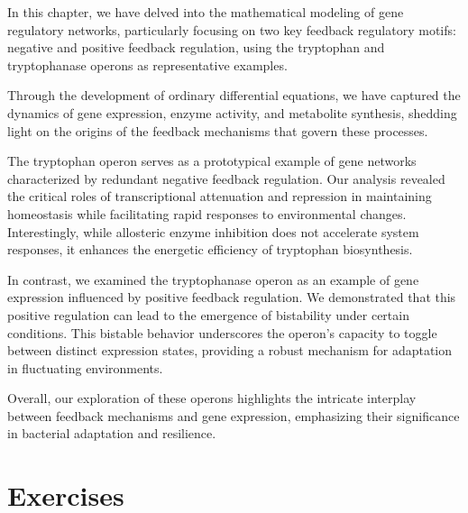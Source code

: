 In this chapter, we have delved into the mathematical modeling of gene regulatory networks, particularly focusing on two key feedback regulatory motifs: negative and positive feedback regulation, using the tryptophan and tryptophanase operons as representative examples.

Through the development of ordinary differential equations, we have captured the dynamics of gene expression, enzyme activity, and metabolite synthesis, shedding light on the origins of the feedback mechanisms that govern these processes.

The tryptophan operon serves as a prototypical example of gene networks characterized by redundant negative feedback regulation. Our analysis revealed the critical roles of transcriptional attenuation and repression in maintaining homeostasis while facilitating rapid responses to environmental changes. Interestingly, while allosteric enzyme inhibition does not accelerate system responses, it enhances the energetic efficiency of tryptophan biosynthesis.

In contrast, we examined the tryptophanase operon as an example of gene expression influenced by positive feedback regulation. We demonstrated that this positive regulation can lead to the emergence of bistability under certain conditions. This bistable behavior underscores the operon's capacity to toggle between distinct expression states, providing a robust mechanism for adaptation in fluctuating environments.

Overall, our exploration of these operons highlights the intricate interplay between feedback mechanisms and gene expression, emphasizing their significance in bacterial adaptation and resilience.

\section{Exercises}

